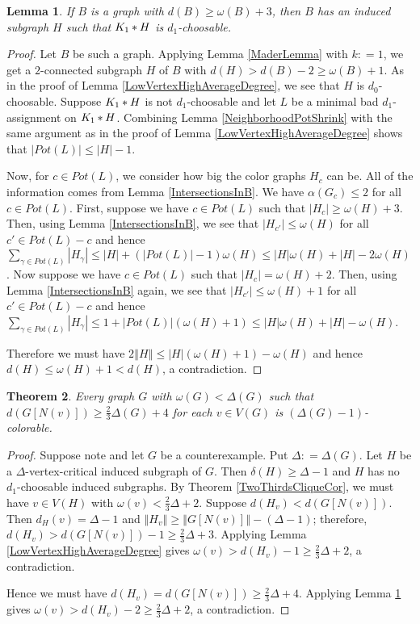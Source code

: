 \documentclass[12pt]{article}
\theoremstyle{plain}
\newtheorem{thm}{Theorem}[section]
\newtheorem{lem}[thm]{Lemma}
\theoremstyle{definition}
\theoremstyle{remark}
\newcommand{\card}[1]{\left|#1\right|}
\newcommand{\size}[1]{\left\Vert#1\right\Vert}
\newcommand{\join}[2]{#1 \mbox{\hspace{2 pt}$\ast$\hspace{2 pt}} #2}
\newcommand{\parens}[1]{\left( #1 \right)}
\newcommand{\DefinedAs}{\mathrel{\mathop:}=}
\begin{document}
\begin{lem}\label{VertexHighAverageDegree}
If $B$ is a graph with $d(B) \geq \omega(B) + 3$, then $B$ has an induced subgraph $H$ such that $\join{K_1}{H}$ is $d_1$-choosable.
\end{lem}
\begin{proof}
Let $B$ be such a graph.  Applying Lemma \ref{MaderLemma} with $k \DefinedAs 1$, we get a $2$-connected subgraph $H$ of $B$ with $d(H) > d(B) - 2 \geq \omega(B) + 1$.  As in the proof of Lemma \ref{LowVertexHighAverageDegree}, we see that $H$ is $d_0$-choosable. Suppose $\join{K_1}{H}$ is not $d_1$-choosable and let $L$ be a minimal bad $d_1$-assignment on $\join{K_1}{H}$.  Combining Lemma \ref{NeighborhoodPotShrink} with the same argument as in the proof of Lemma \ref{LowVertexHighAverageDegree} shows that $\card{Pot(L)} \leq \card{H}-1$.

Now, for $c \in Pot(L)$, we consider how big the color graphs $H_c$ can be.  All of the information comes from Lemma \ref{IntersectionsInB}. We have $\alpha(G_c) \leq 2$ for all $c \in Pot(L)$. First, suppose we have $c \in Pot(L)$ such that $\card{H_c} \geq \omega(H) + 3$.  Then, using Lemma \ref{IntersectionsInB}, we see that $\card{H_{c'}} \leq \omega(H)$ for all $c' \in Pot(L) - c$ and hence $\sum_{\gamma \in Pot(L)} \card{H_\gamma} \leq \card{H} + \parens{\card{Pot(L)} - 1}\omega(H) \leq \card{H}\omega(H) + \card{H} - 2\omega(H)$.  Now suppose we have $c \in Pot(L)$ such that $\card{H_c} = \omega(H) + 2$.  Then, using Lemma \ref{IntersectionsInB} again, we see that $\card{H_{c'}} \leq \omega(H) + 1$ for all $c' \in Pot(L) - c$ and hence $\sum_{\gamma \in Pot(L)} \card{H_\gamma} \leq 1 + \card{Pot(L)}(\omega(H) + 1) \leq \card{H}\omega(H) + \card{H} - \omega(H)$.

Therefore we must have $2\size{H} \leq \card{H}(\omega(H) + 1) - \omega(H)$ and hence $d(H) \leq \omega(H) + 1 < d(H)$, a contradiction.
\end{proof}

\begin{thm}\label{BKdense}
Every graph $G$ with $\omega(G) < \Delta(G)$ such that $d(G[N(v)]) \geq \frac23\Delta(G) + 4$ for each $v \in V(G)$ is $(\Delta(G)-1)$-colorable.
\end{thm}
\begin{proof}
Suppose note and let $G$ be a counterexample. Put $\Delta \DefinedAs \Delta(G)$.  Let $H$ be a $\Delta$-vertex-critical induced subgraph of $G$.  Then $\delta(H) \geq \Delta - 1$ and $H$ has no $d_1$-choosable induced subgraphs. By Theorem \ref{TwoThirdsCliqueCor}, we must have $v \in V(H)$ with $\omega(v) < \frac23\Delta + 2$. Suppose $d(H_v) < d(G[N(v)])$. Then $d_H(v) = \Delta - 1$ and $\size{H_v} \geq \size{G[N(v)]} - (\Delta - 1)$; therefore, $d(H_v) > d(G[N(v)]) - 1 \geq \frac23\Delta + 3$.  Applying Lemma \ref{LowVertexHighAverageDegree} gives $\omega(v) > d(H_v) - 1 \geq \frac23\Delta + 2$, a contradiction.

Hence we must have $d(H_v) = d(G[N(v)]) \geq \frac23\Delta + 4$.  Applying Lemma \ref{VertexHighAverageDegree} gives $\omega(v) > d(H_v) - 2 \geq \frac23\Delta + 2$, a contradiction.
\end{proof}
\end{document}
